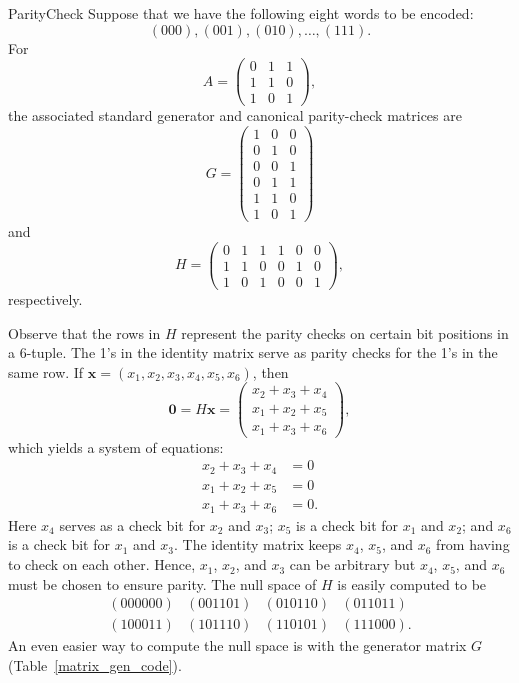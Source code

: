  
\begin{example}{ParityCheck}\label{ParityCheckFix}
Suppose that we have the following eight words to be
encoded:
\[
(000), (001), (010), \ldots, (111).
\] 
For
\[
A =
\begin{pmatrix}
0 & 1 & 1 \\
1 & 1 & 0 \\
1 & 0 & 1
\end{pmatrix},
\]
the associated standard generator and canonical parity-check matrices
are 
\[
G=
\begin{pmatrix}
1 & 0 & 0 \\
0 & 1 & 0 \\
0 & 0 & 1 \\
0 & 1 & 1 \\
1 & 1 & 0 \\
1 & 0 & 1
\end{pmatrix}
\]
and
\[
H =
\begin{pmatrix}
0 & 1 & 1 & 1 & 0 & 0 \\
1 & 1 & 0 & 0 & 1 & 0 \\
1 & 0 & 1 & 0 & 0 & 1
\end{pmatrix},
\]
respectively.
 
 
Observe that the rows in $H$  represent the parity checks on certain
bit positions in a 6-tuple. The 1's in the identity matrix serve as
parity checks for the 1's in the same row. If ${\mathbf x} = (x_1, x_2,
x_3, x_4, x_5, x_6)$, then 
\[
{\mathbf 0}
=
H{\mathbf x}
=
\begin{pmatrix}
x_2 + x_3 + x_4 \\
x_1 + x_2 + x_5\\
x_1 + x_3 + x_6
\end{pmatrix},
\]
which yields a system of equations:
\begin{align*}
x_2 + x_3 + x_4 & = 0 \\
x_1 + x_2 + x_5 & = 0 \\
x_1 + x_3 + x_6 & = 0.
\end{align*}
Here $x_4$ serves as a check bit for $x_2$ and $x_3$; $x_5$ is a check
bit for $x_1$ and $x_2$; and $x_6$ is a check bit for $x_1$ and $x_3$.
The identity matrix keeps $x_4$, $x_5$, and $x_6$ from having to check
on each other. Hence, $x_1$, $x_2$, and $x_3$ can be arbitrary but
$x_4$, $x_5$, and $x_6$ must be chosen to ensure parity. The null
space of $H$ is easily computed to be
\[
\begin{array}{cccc}
 (000000) & (001101) & (010110) & (011011) \\
 (100011) & (101110) & (110101) & (111000).
\end{array}
\]
An even easier way to compute the null space is with the generator
matrix $G$ (Table~\ref{matrix_gen_code}). 
\end{example}
 
